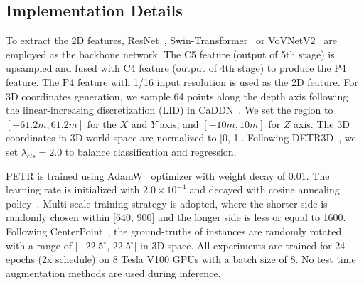 \documentclass[runningheads]{llncs}
\begin{document}
\subsection{Implementation Details}
To extract the 2D features, ResNet~\cite{he2016resnet}, Swin-Transformer~\cite{liu2021swin} or VoVNetV2~\cite{lee2020centermask} are employed as the backbone network. The C5 feature (output of 5th stage) is upsampled and fused with C4 feature (output of 4th stage) to produce the P4 feature. The P4 feature with 1/16 input resolution is used as the 2D feature.
For 3D coordinates generation, we sample 64 points along the depth axis following the linear-increasing discretization (LID) in CaDDN~\cite{reading2021categorical}. We set the region to $[-61.2m, 61.2m]$ for the $X$ and $Y$ axis, and $[-10m, 10m]$ for $Z$ axis. The 3D coordinates in 3D world space are normalized to [0, 1]. Following DETR3D~\cite{wang2022detr3d}, we set $\lambda_{cls} = 2.0$ to balance classification and regression.

PETR is trained using AdamW~\cite{loshchilov2017decoupled} optimizer with weight decay of 0.01. The learning rate is initialized with $2.0\times10^{-4}$ and decayed with cosine annealing policy~\cite{loshchilov2016sgdr}. Multi-scale training strategy is adopted, where the shorter side is randomly chosen within [640, 900] and the longer side is less or equal to 1600. Following CenterPoint~\cite{yin2021center}, the ground-truths of instances are randomly rotated with a range of [$-22.5^{\circ}$, $22.5^{\circ}$] in 3D space.  All experiments are trained for 24 epochs (2x schedule) on 8 Tesla V100 GPUs with a batch size of 8. No test time augmentation methods are used during inference.
\end{document}

